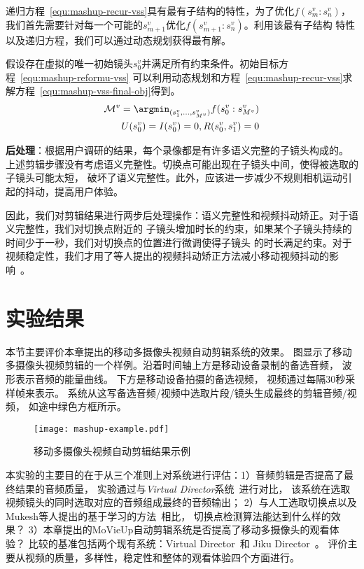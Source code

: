 递归方程~\eqref{equ:mashup-recur-vss}具有最有子结构的特性，为了优化$f(s_m^v:s_n^v)$，
我们首先需要针对每一个可能的$s_{m+1}^v$优化$f(s_{m+1}^v:s_n^v)$。利用该最有子结构
特性以及递归方程，我们可以通过动态规划获得最有解。

假设存在虚拟的唯一初始镜头$s_0^v$并满足所有约束条件。初始目标方程~\eqref{equ:mashup-reformu-vss}
可以利用动态规划和方程~\eqref{equ:mashup-recur-vss}求解方程~\eqref{equ:mashup-vss-final-obj}得到。
\begin{eqnarray}
    \mathcal{M}^v = \argmin_{(s_1^v, \ldots,
    s_{M^v}^v)}{f(s_0^v:s_{M^v}^v)} \nonumber\\
    U(s_0^v) = I(s_0^v) = 0, R(s_0^v, s_1^v) = 0
    \label{equ:mashup-vss-final-obj}
\end{eqnarray}

\textbf{后处理}：根据用户调研的结果，每个录像都是有许多语义完整的子镜头构成的。
上述剪辑步骤没有考虑语义完整性。切换点可能出现在子镜头中间，使得被选取的子镜头可能太短，
破坏了语义完整性。此外，应该进一步减少不规则相机运动引起的抖动，提高用户体验。

因此，我们对剪辑结果进行两步后处理操作：语义完整性和视频抖动矫正。对于语义完整性，我们对切换点附近的
子镜头增加时长的约束，如果某个子镜头持续的时间少于一秒，我们对切换点的位置进行微调使得子镜头
的时长满足约束。对于视频稳定性，我们才用了等人提出的视频抖动矫正方法减小移动视频抖动的影响~\cite{liu2013bundled}。


\section{实验结果}
本节主要评价本章提出的移动多摄像头视频自动剪辑系统的效果。
图显示了移动多摄像头视频剪辑的一个样例。沿着时间轴上方是移动设备录制的备选音频，
波形表示音频的能量曲线。 下方是移动设备拍摄的备选视频，
视频通过每隔30秒采样帧来表示。
系统从这写备选音频/视频中选取片段/镜头生成最终的剪辑音频/视频，
如途中绿色方框所示。
\begin{figure}[ht]
    \centering
    \texttt{[image: mashup-example.pdf]}
    \caption{移动多摄像头视频自动剪辑结果示例}
    \label{fig:mashup-example}
\end{figure}

本实验的主要目的在于从三个准则上对系统进行评估：1）音频剪辑是否提高了最终结果的音频质量，
实验通过与\emph{Virtual Director}系统~\cite{DBLP:conf/mm/ShresthaWWBA10}进行对比，
该系统在选取视频镜头的同时选取对应的音频组成最终的音频输出；
2）与人工选取切换点以及Mukesh等人提出的基于学习的方法~\cite{DBLP:conf/mm/SainiGYO12}相比，
切换点检测算法能达到什么样的效果？
3）本章提出的MoVieUp自动剪辑系统是否提高了移动多摄像头的观看体验？
比较的基准包括两个现有系统：Virtual Director~\cite{DBLP:conf/mm/ShresthaWWBA10}和
Jiku Director~\cite{DBLP:conf/mm/SainiGYO12}。
评价主要从视频的质量，多样性，稳定性和整体的观看体验四个方面进行。

